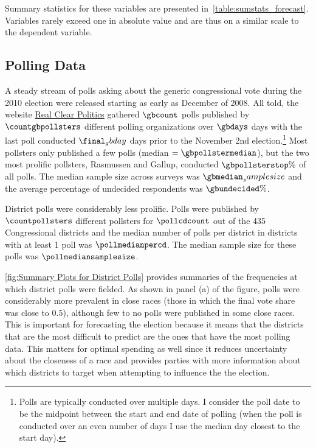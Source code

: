 \documentclass[12pt,final,fleqn]{article}
\theoremstyle{plain}
\begin{document}
Summary statistics for these variables are presented in~\autoref{table:sumstats_forecast}. Variables rarely exceed one in absolute value and are thus on a similar scale to the dependent variable.

\subsection{Polling Data} \label{sec:poll-data}
A steady stream of polls asking about the generic congressional vote during the 2010 election were released starting as early as December of 2008. All told, the website \href{http://www.realclearpolitics.com/}{Real Clear Politics} gathered  $\gbcount$ polls published by $\countgbpollsters$ different polling organizations over $\gbdays$ days with the last poll conducted $\final_gbday$ days prior to the November 2nd election.\footnote{Polls are typically conducted over multiple days. I consider the poll date to be the midpoint between the start and end date of polling (when the poll is conducted over an even number of days I use the median day closest to the start day).} Most pollsters only published a few polls (median $= \gbpollstermedian$), but the two most prolific pollsters,  Rasmussen and Gallup, conducted $\gbpollsterstop\%$ of all polls. The median sample size across surveys was $\gbmedian_samplesize$ and the average percentage of undecided respondents was $\gbundecided\%$.

District polls were considerably less prolific. Polls were published by $\countpollsters$ different pollsters for $\pollcdcount$ out of the 435 Congressional districts and the median number of polls per district in districts with at least 1 poll was $\pollmedianpercd$. The median sample size for these polls was $\pollmediansamplesize$. 

\autoref{fig:Summary Plots for District Polls} provides summaries of the frequencies at which district polls were fielded. As shown in panel (a) of the figure, polls were considerably more prevalent in close races (those in which the final vote share was close to $0.5$), although few to no polls were published in some close races. This is important for forecasting the election because it means that the districts that are the most difficult to predict are the ones that have the most polling data. This matters for optimal spending as well since it reduces uncertainty about the closeness of a race and provides parties with more information about which districts to target when attempting to influence the the election.
\end{document}
